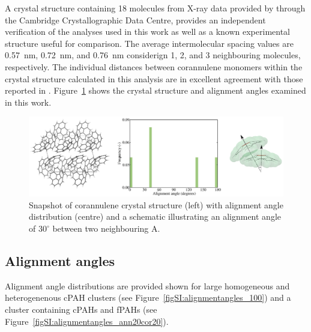 A crystal structure containing 18 molecules from X-ray data provided by \citet{Petrukhina2005} through the Cambridge Crystallographic Data Centre, provides an independent verification of the analyses used in this work as well as a known experimental structure useful for comparison. The average intermolecular spacing values are 0.57~nm, 0.72~nm, and 0.76~nm considerign 1, 2, and 3 neighbouring molecules, respectively. The individual distances between corannulene monomers within the crystal structure calculated in this analysis are in excellent agreement with those reported in \citet{sanyal2014functional}. Figure~\ref{figSI:corannulene_crystal} shows the crystal structure and alignment angles examined in this work.

%
\begin{figure}[!tbh]
\centering
\includegraphics[width=0.8\linewidth]{Figures/corannulene_crystal.eps}
\caption{Snapshot of corannulene crystal structure (left) with alignment angle distribution (centre) and a schematic illustrating an alignment angle of $30^{\circ}$ between two neighbouring A.}
\label{figSI:corannulene_crystal}
\end{figure}
%


\subsection{Alignment angles}
Alignment angle distributions are provided shown for large homogeneous and heterogenenous cPAH clusters (see Figure~\ref{figSI:alignmentangles_100}) and a cluster containing cPAHs and fPAHs (see Figure~\ref{figSI:alignmentangles_ann20cor20}). 

